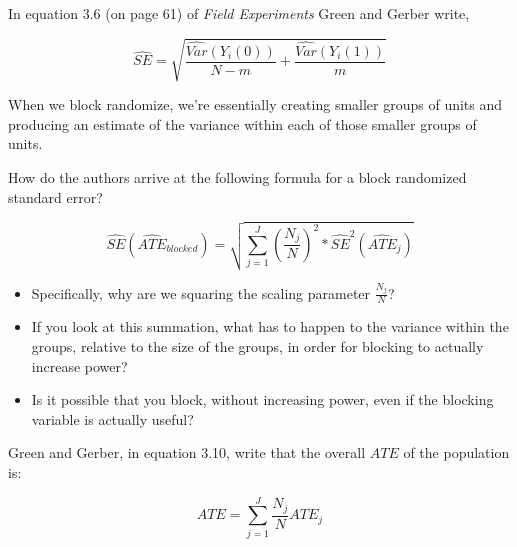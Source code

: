 \documentclass[
]{article}
\providecommand{\tightlist}{%
  \setlength{\itemsep}{0pt}\setlength{\parskip}{0pt}}
\begin{document}
In equation 3.6 (on page 61) of \emph{Field Experiments} Green and Gerber write,

\[ 
  \widehat{SE} = \sqrt{\frac{\widehat{Var}(Y_{i}(0))}{N-m} + \frac{\widehat{Var}(Y_{i}(1))}{m}}
\]

When we block randomize, we're essentially creating smaller groups of units and producing an estimate of the variance within each of those smaller groups of units.

How do the authors arrive at the following formula for a block randomized standard error?

\[ 
  \widehat{SE}(\widehat{ATE}_{blocked}) = \sqrt{\sum_{j=1}^{J}\left(\frac{N_{j}}{N}\right)^2 * \widehat{SE}^2(\widehat{ATE}_{j})}
\]

\begin{itemize}
\tightlist
\item
  Specifically, why are we squaring the scaling parameter \(\frac{N_{j}}{N}\)?
\item
  If you look at this summation, what has to happen to the variance within the groups, relative to the size of the groups, in order for blocking to actually increase power?
\item
  Is it possible that you block, without increasing power, even if the blocking variable is actually useful?
\end{itemize}

Green and Gerber, in equation 3.10, write that the overall \(ATE\) of the population is:

\[ 
  ATE = \sum_{j=1}^{J} \frac{N_{j}}{N} ATE_{j}
\]
\end{document}

